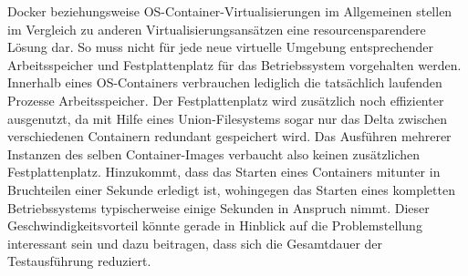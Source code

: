 Docker beziehungsweise OS-Container-Virtualisierungen im Allgemeinen stellen im Vergleich zu anderen Virtualisierungsansätzen eine resourcensparendere Lösung dar. So muss nicht für jede neue virtuelle Umgebung entsprechender Arbeitsspeicher und Festplattenplatz für das Betriebssystem vorgehalten werden. Innerhalb eines OS-Containers verbrauchen lediglich die tatsächlich laufenden Prozesse Arbeitsspeicher. Der Festplattenplatz wird zusätzlich noch effizienter ausgenutzt, da mit Hilfe eines Union-Filesystems sogar nur das Delta zwischen verschiedenen Containern redundant gespeichert wird. Das Ausführen mehrerer Instanzen des selben Container-Images verbaucht also keinen zusätzlichen Festplattenplatz. Hinzukommt, dass das Starten eines Containers mitunter in Bruchteilen einer Sekunde erledigt ist, wohingegen das Starten eines kompletten Betriebssystems typischerweise einige Sekunden in Anspruch nimmt. Dieser Geschwindigkeitsvorteil könnte gerade in Hinblick auf die Problemstellung interessant sein und dazu beitragen, dass sich die Gesamtdauer der Testausführung reduziert.